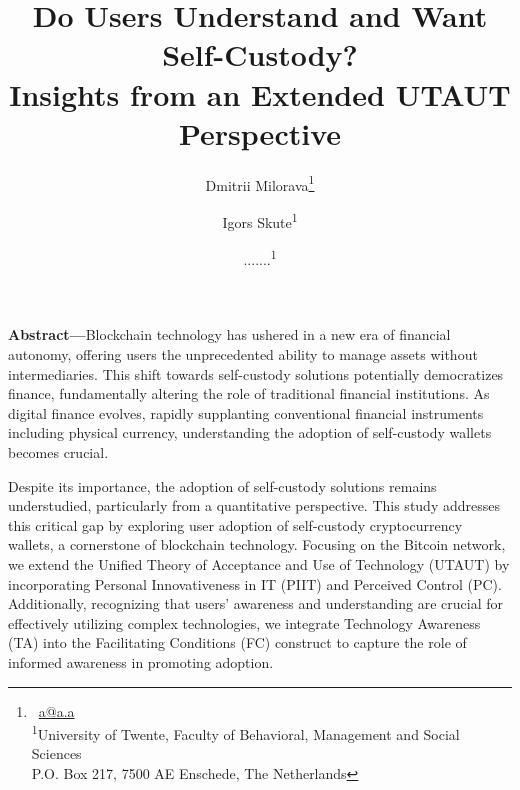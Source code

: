 \documentclass[twocolumn]{article}
\title{\textbf{Do Users Understand and Want Self-Custody?\\
Insights from an Extended UTAUT Perspective}}
\author{Dmitrii Milorava\thanks{
        \faEnvelope\ \href{mailto:a@a.a}{a@a.a} \\
        \textsuperscript{1}University of Twente, Faculty of Behavioral, Management and Social Sciences \\
        P.O. Box 217, 7500 AE Enschede, The Netherlands
    } \and
    Igors Skute\textsuperscript{1} \and
    .......\textsuperscript{1}
}
\date{}
\begin{document}




\noindent
\textbf{Abstract—}Blockchain technology has ushered in a new era of financial autonomy, offering users the unprecedented ability to manage assets without intermediaries. This shift towards self-custody solutions potentially democratizes finance, fundamentally altering the role of traditional financial institutions. As digital finance evolves, rapidly supplanting conventional financial instruments including physical currency, understanding the adoption of self-custody wallets becomes crucial.

Despite its importance, the adoption of self-custody solutions remains understudied, particularly from a quantitative perspective. This study addresses this critical gap by exploring user adoption of self-custody cryptocurrency wallets, a cornerstone of blockchain technology. Focusing on the Bitcoin network, we extend the Unified Theory of Acceptance and Use of Technology (UTAUT) by incorporating Personal Innovativeness in IT (PIIT) and Perceived Control (PC). Additionally, recognizing that users' awareness and understanding are crucial for effectively utilizing complex technologies, we integrate Technology Awareness (TA) into the Facilitating Conditions (FC) construct to capture the role of informed awareness in promoting adoption.
\end{document}
